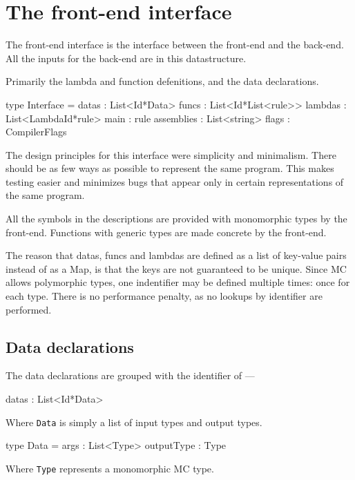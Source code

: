 \section{The front-end interface}
The front-end interface is the interface between the front-end and the back-end.
All the inputs for the back-end are in this datastructure.

Primarily the lambda and function defenitions, and the data declarations.

\begin{code}
type Interface = {
  datas      : List<Id*Data>
  funcs      : List<Id*List<rule>>
  lambdas    : List<LambdaId*rule>
  main       : rule
  assemblies : List<string> 
  flags      : CompilerFlags
}
\end{code}

The design principles for this interface were simplicity and minimalism.
There should be as few ways as possible to represent the same program.
This makes testing easier and minimizes bugs that appear only in certain representations of the same program.

All the symbols in the descriptions are provided with monomorphic types by the front-end.
Functions with generic types are made concrete by the front-end.

The reason that datas, funcs and lambdas are defined as a list of key-value pairs instead of as a Map, is that the keys are not guaranteed to be unique.
Since MC allows polymorphic types, one indentifier may be defined multiple times: once for each type.
There is no performance penalty, as no lookups by identifier are performed.

\subsection{Data declarations}
The data declarations are grouped with the identifier of ---

\begin{code}
datas : List<Id*Data>
\end{code}

Where \verb|Data| is simply a list of input types and output types.

\begin{code}
type Data = {
  args       : List<Type>
  outputType : Type
}
\end{code}

Where \verb|Type| represents a monomorphic MC type.


